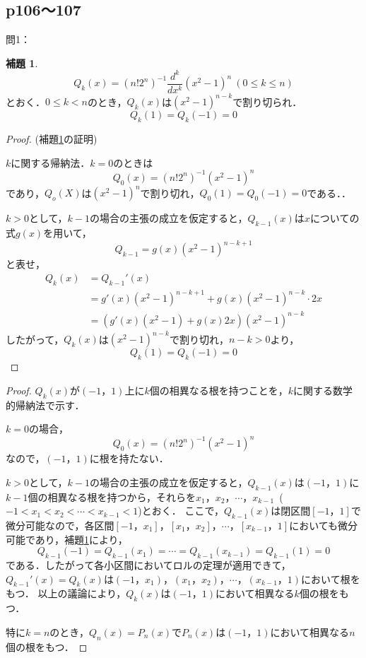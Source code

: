 \documentclass[dvipdfmx,uplatex,11pt]{jsarticle}
\theoremstyle{definition}
\newtheorem{lemm}{補題}[section]
\begin{document}
\subsection{p106〜107}
問1：
\begin{lemm}
    \label{補題:p106.問1}
    \[
        Q_k (x)= (n! 2^n)^{-1} \frac{d^k}{dx^k} (x^2-1)^n~(0 \le k \le n)
    \]
とおく．$0 \le k <n$のとき，$Q_k (x)$は$(x^2-1)^{n-k}$で割り切られ．
\[
    Q_k (1)= Q_k(-1)=0
\]
\end{lemm}

\begin{proof}(補題\ref{補題:p106.問1}の証明)\par 
    $k$に関する帰納法．$k=0$のときは
    \[
        Q_0(x)= (n! 2^n)^{-1} (x^2-1)^n
    \]
    であり，$Q_o(X)$は$(x^2-1)^n$で割り切れ，$Q_0(1)=Q_0(-1)=0$である．．\par 
    $k>0$として，$k-1$の場合の主張の成立を仮定すると，$Q_{k-1}(x)$は$x$についての式$g(x)$を用いて，
    \[
        Q_{k-1} = g(x)(x^2-1)^{n-k+1}
    \]
    と表せ，
    \begin{align*}
        Q_k (x) & =Q_{k-1}' (x) \\
        &= g'(x)(x^2-1)^{n-k+1} + g(x) (x^2-1)^{n-k} \cdot 2x \\
        &=(g'(x)(x^2-1)+g(x)2x) (x^2-1)^{n-k}
    \end{align*}
    したがって，$Q_k(x)$は$(x^2-1)^{n-k}$で割り切れ，$n-k >0$より，
    \[
        Q_k (1)= Q_k(-1)=0
    \]
\end{proof}

\begin{leftbar}
    \begin{proof}
        $Q_k (x)$が$(-1，1)$上に$k$個の相異なる根を持つことを，$k$に関する数学的帰納法で示す．\par 
        $k=0$の場合，
        \[
            Q_0(x)= (n! 2^n)^{-1} (x^2-1)^n
        \]
        なので，$(-1，1)$に根を持たない．\par 
        $k>0$として，$k-1$の場合の主張の成立を仮定すると，$Q_{k-1}(x)$は$(-1，1)$に$k-1$個の相異なる根を持つから，それらを$x_1，x_2，\cdots，x_{k-1}$~($-1<x_1<x_2<\cdots <x_{k-1}<1$)とおく．
        ここで，$Q_{k-1} (x)$は閉区間$[-1，1]$で微分可能なので，各区間$[-1，x_1]，[x_1，x_2]，\cdots，[x_{k-1}，1]$においても微分可能であり，補題\ref{補題:p106.問1}により，
        \[
            Q_{k-1} (-1) = Q_{k-1}(x_1)=\cdots = Q_{k-1}(x_{k-1})=Q_{k-1}(1)=0
        \]
        である．したがって各小区間においてロルの定理が適用できて，$Q_{k-1}' (x)=Q_k(x)$は$(-1，x_1)，(x_1，x_2)，\cdots ，(x_{k-1}，1)$において根をもつ．
        以上の議論により，$Q_k (x)$は$(-1，1)$において相異なる$k$個の根をもつ．\par 
        特に$k=n$のとき，$Q_n (x)=P_n(x)$で$P_n (x)$は$(-1，1)$において相異なる$n$個の根をもつ．
    \end{proof}
\end{leftbar}
\end{document}
